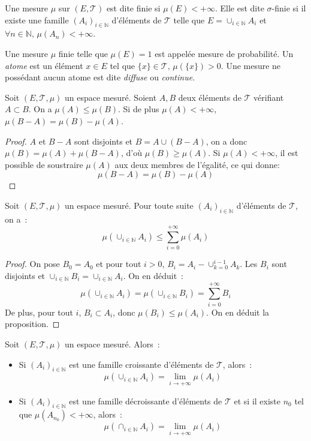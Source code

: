 \begin{defn}
Une mesure $\mu$ sur $(E, \mathcal{T})$ est dite finie si $\mu(E) <
+\infty$. Elle est dite $\sigma$-finie si il existe une famille
$(A_i)_{i \in \mathbb{N}}$ d'éléments de $\mathcal{T}$ telle que $E =
\cup_{i \in \mathbb{N}} A_i$ et $\forall n \in \mathbb{N}, \, \mu(A_n) < +\infty$.
\end{defn}
Une mesure $\mu$ finie telle que $\mu(E) = 1$ est appelée mesure de
probabilité. Un {\em atome} est un élément $x \in E$ tel que
$\{x\} \in \mathcal{T}, \, \mu(\{x\}) > 0$. Une mesure ne possédant
aucun atome est dite {\em diffuse} ou {\em continue}.
\begin{mandatory}
\begin{prop}\label{prop:1}
Soit $(E, \mathcal{T}, \mu)$ un espace mesuré. Soient $A,B$ deux
éléments de  $\mathcal{T}$ vérifiant $A \subset B$. On a $\mu(A) \leq
\mu(B)$. Si de plus $\mu(A) < +\infty$, $\mu(B-A) = \mu(B) - \mu(A)$.
\end{prop}
\end{mandatory}
\begin{proof}
$A$ et $B-A$ sont disjoints et $B = A \cup (B-A)$, on a donc $\mu(B) =
\mu(A) + \mu(B-A)$, d'où $\mu(B) \geq \mu(A)$. Si $\mu(A)< +\infty$, il est
possible de soustraire $\mu(A)$ aux deux membres de l'égalité, ce qui donne:
\[
\mu(B-A) = \mu(B) - \mu(A)
\]
\end{proof}
\begin{mandatory}
\begin{prop}
Soit $(E, \mathcal{T}, \mu)$ un espace mesuré. Pour toute suite
$(A_i)_{i \in \mathbb{N}}$ d'éléments de  $\mathcal{T}$, on a~:
\[
\mu \left ( \cup_{i \in \mathbb{N}} A_i \right ) \leq 
\sum_{i =0}^{+\infty} \mu(A_i)
\]
\end{prop}
\end{mandatory}
\begin{proof}
On pose $B_0 =A_0$ et pour tout $i > 0$, $B_i = A_i - \cup_{k=0}^{i-1}
A_k$. Les $B_i$ sont disjoints et $\cup_{i\in \mathbb{N}}B_i = \cup_{i
  \in \mathbb{N}} A_i$. On en déduit~:
\[
\mu(\cup_{i \in \mathbb{N}}A_i) = \mu(\cup_{i \in \mathbb{N}} B_i) =
\sum_{i = 0}^{+\infty} B_i
\] 
De plus, pour tout $i$, $B_i
\subset A_i$, donc $\mu(B_i) \leq \mu(A_i)$. On en déduit la proposition.
\end{proof}
\begin{mandatory}
\begin{prop}
Soit $(E, \mathcal{T}, \mu)$ un espace mesuré. Alors~:
\begin{itemize}
\item Si $(A_i)_{i \in \mathbb{N}}$ est une famille croissante
  d'éléments de  $\mathcal{T}$, alors~:
\[
\mu(\cup_{i \in \mathbb{N}} A_i) =
  \lim_{i \to +\infty}\mu(A_i)
\]
\item  Si $(A_i)_{i \in \mathbb{N}}$ est une famille décroissante
  d'éléments de  $\mathcal{T}$ et si il existe $n_0$ tel que
  $\mu(A_{n_0})<+\infty$, alors~:
\[
\mu(\cap_{i \in \mathbb{N}} A_i) =  \lim_{i
  \to +\infty} \mu(A_i)
\]
\end{itemize}
\end{prop}
\end{mandatory}

